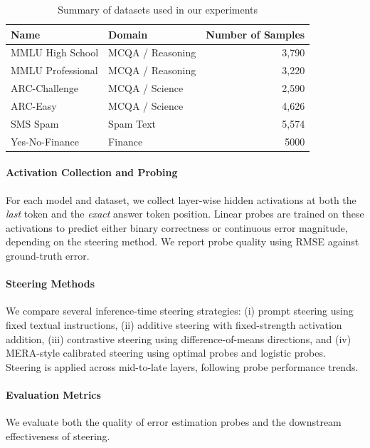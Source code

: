 \documentclass[sigconf]{acmart}
\begin{document}
\begin{table}[t]
\centering
\caption{Summary of datasets used in our experiments}
\label{tab:datasets}
\begin{tabular}{l l r}
\toprule
\textbf{Name} & \textbf{Domain} & \textbf{Number of Samples} \\
\midrule
MMLU High School     & MCQA / Reasoning & 3,790 \\
MMLU Professional   & MCQA / Reasoning & 3,220 \\
ARC-Challenge       & MCQA / Science   & 2,590 \\
ARC-Easy            & MCQA / Science   & 4,626 \\
SMS Spam            & Spam Text        & 5,574 \\
Yes-No-Finance      & Finance          & 5000 \\
\bottomrule
\end{tabular}
\end{table}

\paragraph{Activation Collection and Probing}
For each model and dataset, we collect layer-wise hidden activations at both the \emph{last} token and the \emph{exact} answer token position. Linear probes are trained on these activations to predict either binary correctness or continuous error magnitude, depending on the steering method. We report probe quality using RMSE against ground-truth error.

\paragraph{Steering Methods}
We compare several inference-time steering strategies:
(i) prompt steering using fixed textual instructions,
(ii) additive steering with fixed-strength activation addition,
(iii) contrastive steering using difference-of-means directions, and
(iv) MERA-style calibrated steering using optimal probes and logistic probes.
Steering is applied across mid-to-late layers, following probe performance trends.

\paragraph{Evaluation Metrics}
We evaluate both the quality of error estimation probes and the downstream effectiveness of steering.
\end{document}
